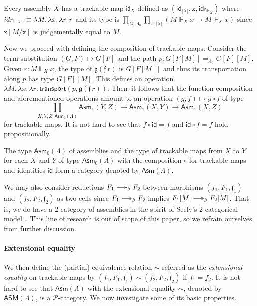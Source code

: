 \documentclass[a4paper,UKenglish,numberwithinsect,cleveref,thm-restate]{lipics-v2021}
\newcommand{\PP}{\mathscr{P}}
\newcommand{\Asm}{\mathsf{Asm}}
\newcommand{\ASM}{\mathsf{ASM}}
\newcommand{\defeq}{\vcentcolon\equiv}
\newcommand{\id}{\mathsf{id}}
\DeclareRobustCommand\longtwoheadrightarrow{\relbar\joinrel\twoheadrightarrow}
\newcommand{\reduce}{\longtwoheadrightarrow_{\beta}}
\theoremstyle{plain}
\begin{document}
\begin{example}
  Every assembly $X$ has a trackable map $\id_X$ defined as $(\mathsf{id}_{|X|}, \mathtt{x}, \mathsf{idr}_{\Vdash_X})$
  where $\mathsf{idr}_{\Vdash_X} \defeq \lambda M.\,\lambda x.\,\lambda r.\, r$ and its type is
    $\prod_{M : \Lambda_0} \prod_{x : |X|} \left( M \Vdash_X x \to M  \Vdash_X x  \right)$
  since $\mathtt{x}[M/\mathtt{x}]$ is judgementally equal to $M$.
\end{example}
Now we proceed with defining the composition of trackable maps. Consider the term substitution $(G, F)
\mapsto G [ F ]$ and the path $p : G[F[M]] =_{\Lambda_0} G[F] [M]$.
Given $r : M \Vdash_X x$, the type of $\mathfrak{g}(\mathfrak{f}\,r)$ is $G[F[M]]$ and thus its transportation along $p$ has type $G[F][M]$.
This defines an operation $\lambda M.\,\lambda x.\,\lambda r.\, \mathsf{transport}(p, \mathfrak{g}(\mathfrak{f}\,r))$.
Then, it follows that the function composition and aforementioned operations amount to an operation $(g, f) \mapsto g \circ f$ of type
\[
  \prod_{X, Y, Z : \Asm_0(\Lambda)} \Asm_1(Y, Z) \to \Asm_1(X, Y) \to \Asm_1(X, Z)
\]
for trackable maps. It is not hard to see that $f \circ \id = f$ and $\id \circ f = f$ hold propositionally.

\begin{proposition}\label{prop:category-of-assemblies}
  The type $\Asm_0(\Lambda)$ of assemblies and the type of trackable maps from $X$ to $Y$ for each $X$ and $Y$ of type $\Asm_0(\Lambda)$ with the composition $\circ$ for trackable maps and identities $\id$ form a category denoted by $\Asm(\Lambda)$.
\end{proposition}
We may also consider reductions $F_1 \reduce F_2$ between morphisms $(f_1, F_1, \mathfrak{f}_1)$
and $(f_2, F_2, \mathfrak{f}_2)$ as two cells since $F_1 \reduce F_2$ implies $F_1[M] \reduce F_2[M]$.
That is, we do have a $2$-category of assemblies in the spirit of Seely's $2$-categorical model~\cite{Seely1987}.
This line of research is out of scope of this paper, so we refrain ourselves from further discussion. 


\paragraph*{Extensional equality}
We then define the (partial) equivalence relation $\sim$ referred as the \emph{extensional equality} on trackable maps by $(f_1, F_1, \mathfrak{f}_1) \sim (f_2, F_2, \mathfrak{f}_2)$ if $f_1 = f_2$.
It is not hard to see that $\Asm(\Lambda)$ with the extensional equality $\sim$, denoted by $\ASM(\Lambda)$, is a $\PP$-category. 
We now investigate some of its basic properties.
\end{document}
